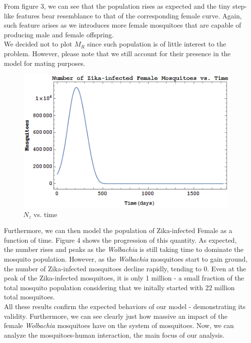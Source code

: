 \documentclass{article}
\begin{document}
From figure 3, we can see that the population rises as expected and the tiny step-like features bear resemblance to that of the corresponding female curve. Again, such feature arises as we introduces more female mosquitoes that are capable of producing male and female offspring.\\

We decided not to plot $M_R$ since such population is of little interest to the problem. However, please note that we still account for their presence in the model for mating purposes.\\

\begin{figure}[h!]
  \includegraphics[width=\linewidth]{NzVSt}
  \caption{$N_z$ vs. time}
  \label{fig:nzvst}
\end{figure}

Furthermore, we can then model the population of Zika-infected Female as a function of time. Figure 4 shows the progression of this quantity. As expected, the number rises and peaks as the \textit{Wolbachia} is still taking time to dominate the mosquito population. However, as the \textit{Wolbachia} mosquitoes start to gain ground, the number of Zika-infected mosquitoes decline rapidly, tending to 0. Even at the peak of the Zika-infected mosquitoes, it is only 1 million - a small fraction of the total mosquito population considering that we initally started with 22 million total mosquitoes. \\

All these results confirm the expected behaviors of our model - demonstrating its validity. Furthermore, we can see clearly just how massive an impact of the female \textit{Wolbachia} mosquitoes have on the system of mosquitoes. Now, we can analyze the mosquitoes-human interaction, the main focus of our analysis.\\
\end{document}

